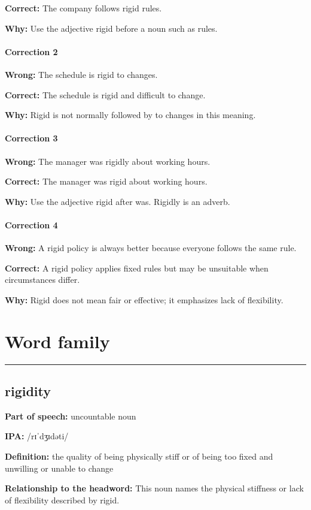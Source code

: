 \documentclass[11pt]{article}
\newcommand{\sectionrule}{\par\vspace{-0.5em}\noindent\textcolor{Accent}{\rule{\linewidth}{0.6pt}}\par}
\begin{document}
\textbf{Correct:} The company follows rigid rules.

\textbf{Why:} Use the adjective rigid before a noun such as rules.

\paragraph{Correction 2}
\textbf{Wrong:} The schedule is rigid to changes.

\textbf{Correct:} The schedule is rigid and difficult to change.

\textbf{Why:} Rigid is not normally followed by to changes in this meaning.

\paragraph{Correction 3}
\textbf{Wrong:} The manager was rigidly about working hours.

\textbf{Correct:} The manager was rigid about working hours.

\textbf{Why:} Use the adjective rigid after was. Rigidly is an adverb.

\paragraph{Correction 4}
\textbf{Wrong:} A rigid policy is always better because everyone follows the same rule.

\textbf{Correct:} A rigid policy applies fixed rules but may be unsuitable when circumstances differ.

\textbf{Why:} Rigid does not mean fair or effective; it emphasizes lack of flexibility.

\section{Word family}
\sectionrule
\subsection{rigidity}
\textbf{Part of speech:} uncountable noun

\textbf{IPA:} /rɪˈdʒɪdəti/

\textbf{Definition:} the quality of being physically stiff or of being too fixed and unwilling or unable to change

\textbf{Relationship to the headword:} This noun names the physical stiffness or lack of flexibility described by rigid.
\end{document}
